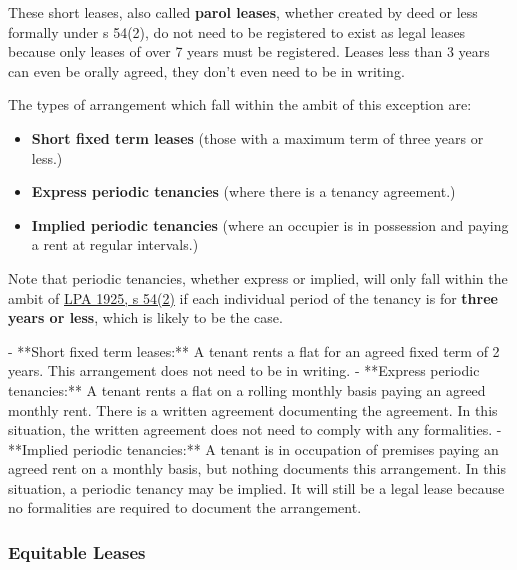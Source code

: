 \documentclass[
]{article}
\newenvironment{Shaded}{}{}
\newcommand{\NormalTok}[1]{#1}
\providecommand{\tightlist}{%
  \setlength{\itemsep}{0pt}\setlength{\parskip}{0pt}}
\begin{document}
These short leases, also called \textbf{parol leases}, whether created
by deed or less formally under s 54(2), do not need to be registered to
exist as legal leases because only leases of over 7 years must be
registered. Leases less than 3 years can even be orally agreed, they
don't even need to be in writing.

The types of arrangement which fall within the ambit of this exception
are:

\begin{itemize}
\tightlist
\item
  \textbf{Short fixed term leases} (those with a maximum term of three
  years or less.)
\item
  \textbf{Express periodic tenancies} (where there is a tenancy
  agreement.)
\item
  \textbf{Implied periodic tenancies} (where an occupier is in
  possession and paying a rent at regular intervals.)
\end{itemize}

Note that periodic tenancies, whether express or implied, will only fall
within the ambit of
\href{https://www.legislation.gov.uk/ukpga/Geo5/15-16/20/section/54}{LPA
1925, s 54(2)} if each individual period of the tenancy is for
\textbf{three years or less}, which is likely to be the case.

\begin{Shaded}
\begin{Highlighting}[]
\NormalTok{{-} **Short fixed term leases:** A tenant rents a flat for an agreed fixed term of 2 years. This arrangement does not need to be in writing.}
\NormalTok{{-} **Express periodic tenancies:** A tenant rents a flat on a rolling monthly basis paying an agreed monthly rent. There is a written agreement documenting the agreement. In this situation, the written agreement does not need to comply with any formalities.}
\NormalTok{{-} **Implied periodic tenancies:** A tenant is in occupation of premises paying an agreed rent on a monthly basis, but nothing documents this arrangement. In this situation, a periodic tenancy may be implied. It will still be a legal lease because no formalities are required to document the arrangement.}
\end{Highlighting}
\end{Shaded}

\hypertarget{equitable-leases}{%
\subsubsection{Equitable Leases}\label{equitable-leases}}
\end{document}
